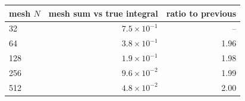 \begin{tabular}{lrr}
\toprule
mesh $N$ & mesh sum vs true integral & ratio to previous \\
\midrule
32 & $7.5\times10^{-1}$ & -- \\
64 & $3.8\times10^{-1}$ & 1.96 \\
128 & $1.9\times10^{-1}$ & 1.98 \\
256 & $9.6\times10^{-2}$ & 1.99 \\
512 & $4.8\times10^{-2}$ & 2.00 \\
\bottomrule
\end{tabular}
